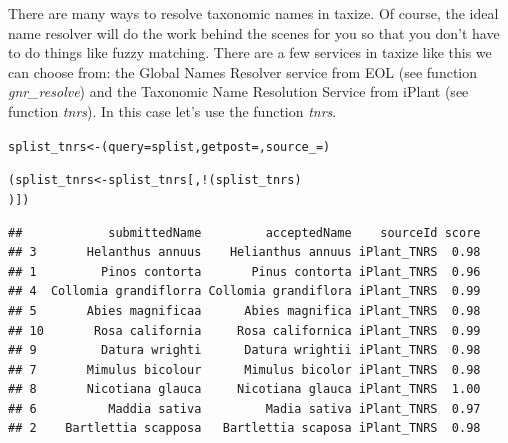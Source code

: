 There are many ways to resolve taxonomic names in taxize. Of course, the ideal name resolver will do the work behind the scenes for you so that you don't have to do things like fuzzy matching. There are a few services in taxize like this we can choose from: the Global Names Resolver service from EOL (see function \emph{gnr\_resolve}) and the Taxonomic Name Resolution Service from iPlant (see function \emph{tnrs}). In this case let's use the function \emph{tnrs}. 

\begin{knitrout}
\color{fgcolor}\begin{kframe}
\begin{alltt}
splist_tnrs <- (query = splist, getpost = , source_ = )
\end{alltt}


{\ttfamily\noindent\itshape\color{messagecolor}{\#\# Calling http://taxosaurus.org/retrieve/679c69546d1311b72ce97f5ad1101254}}\begin{alltt}

(splist_tnrs <- splist_tnrs[, !(splist_tnrs) %
    )])
\end{alltt}
\begin{verbatim}
##            submittedName         acceptedName    sourceId score
## 3       Helanthus annuus    Helianthus annuus iPlant_TNRS  0.98
## 1         Pinos contorta       Pinus contorta iPlant_TNRS  0.96
## 4  Collomia grandiflorra Collomia grandiflora iPlant_TNRS  0.99
## 5       Abies magnificaa      Abies magnifica iPlant_TNRS  0.98
## 10       Rosa california     Rosa californica iPlant_TNRS  0.99
## 9         Datura wrighti      Datura wrightii iPlant_TNRS  0.98
## 7       Mimulus bicolour      Mimulus bicolor iPlant_TNRS  0.98
## 8       Nicotiana glauca     Nicotiana glauca iPlant_TNRS  1.00
## 6          Maddia sativa         Madia sativa iPlant_TNRS  0.97
## 2    Bartlettia scapposa   Bartlettia scaposa iPlant_TNRS  0.98
\end{verbatim}
\begin{alltt}



\end{alltt}
\end{kframe}
\end{knitrout}
